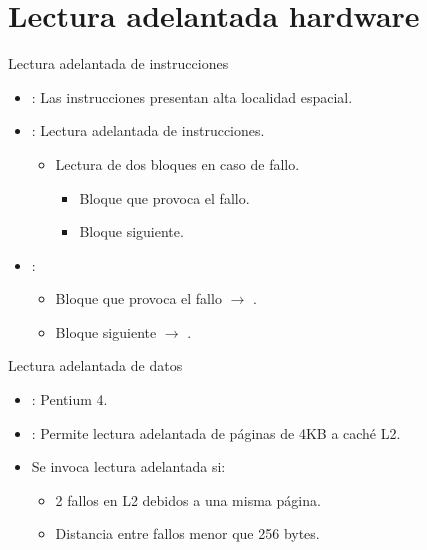 \section{Lectura adelantada hardware}

\begin{frame}[t]{Lectura adelantada de instrucciones}
\begin{itemize}
  \item {}: Las instrucciones presentan 
        alta localidad espacial.

  \item {}: Lectura adelantada
        de instrucciones.
    \begin{itemize}
      \item Lectura de dos bloques en caso de fallo.
        \begin{itemize}
          \item Bloque que provoca el fallo.
          \item Bloque siguiente.
        \end{itemize}
    \end{itemize}

  \item {}:
    \begin{itemize}
      \item Bloque que provoca el fallo $\rightarrow$ .
      \item Bloque siguiente $\rightarrow$ .
    \end{itemize}
\end{itemize}
\end{frame}

\begin{frame}[t]{Lectura adelantada de datos}
\begin{itemize}
  \item {}: Pentium 4.

  \item {}: Permite lectura adelantada de páginas de 4KB a caché L2.

  \item Se invoca lectura adelantada si:
    \begin{itemize}
      \item 2 fallos en L2 debidos a una misma página.
      \item Distancia entre fallos menor que 256 bytes.
    \end{itemize}

\end{itemize}
\end{frame}
